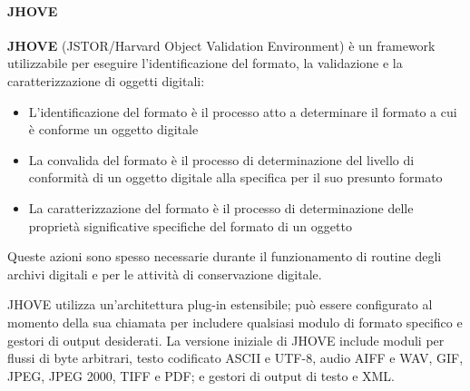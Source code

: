 \paragraph{JHOVE}
\textbf{JHOVE} (JSTOR/Harvard Object Validation Environment) è un framework utilizzabile per eseguire l'identificazione del formato, la validazione e la caratterizzazione di oggetti digitali:

\begin{itemize}
\item L'identificazione del formato è il processo atto a determinare il formato a cui è conforme un oggetto digitale
\item La convalida del formato è il processo di determinazione del livello di conformità di un oggetto digitale alla specifica per il suo presunto formato
\item La caratterizzazione del formato è il processo di determinazione delle proprietà significative specifiche del formato di un oggetto
\end{itemize}

Queste azioni sono spesso necessarie durante il funzionamento di routine degli archivi digitali e per le attività di conservazione digitale.

JHOVE utilizza un'architettura plug-in estensibile; può essere configurato al momento della sua chiamata per includere qualsiasi modulo di formato specifico e gestori di output desiderati. La versione iniziale di JHOVE include moduli per flussi di byte arbitrari, testo codificato ASCII e UTF-8, audio AIFF e WAV, GIF, JPEG, JPEG 2000, TIFF e PDF; e gestori di output di testo e XML.

